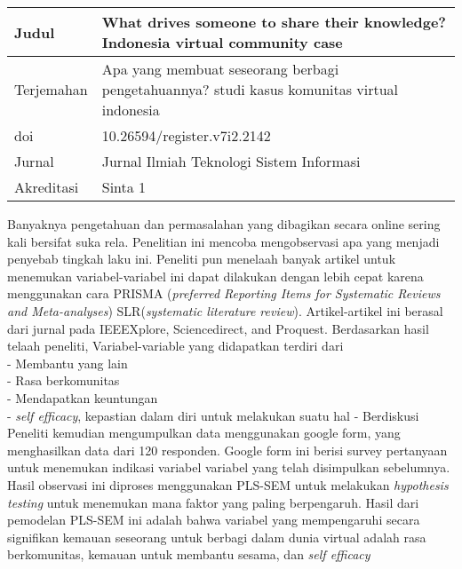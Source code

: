 \documentclass{article}
\begin{document}
\begin{tabular}{|p{2cm}|p{12cm}|}
    \hline
    Judul & What drives someone to share their knowledge? 
    Indonesia virtual community case\cite{WhatsDriveSomSatria2021}\\
    \hline
    Terjemahan & Apa yang membuat seseorang berbagi pengetahuannya? studi kasus komunitas virtual indonesia\\
    \hline
    doi & 10.26594/register.v7i2.2142\\    
    \hline
    Jurnal & Jurnal Ilmiah Teknologi Sistem Informasi\\
    \hline
    Akreditasi & Sinta 1\\
    \hline
\end{tabular}
Banyaknya pengetahuan dan  permasalahan yang dibagikan secara online sering kali bersifat suka rela.
Penelitian ini mencoba mengobservasi 
apa yang menjadi penyebab tingkah laku ini.
 Peneliti pun menelaah banyak artikel untuk menemukan variabel-variabel ini dapat dilakukan dengan lebih cepat karena  menggunakan cara
 PRISMA (\emph{preferred Reporting Items for Systematic
 Reviews and Meta-analyses})
 SLR(\emph{systematic literature review}).
 Artikel-artikel ini berasal dari jurnal pada IEEEXplore, Sciencedirect, and Proquest.
Berdasarkan hasil telaah peneliti, Variabel-variable yang didapatkan terdiri dari\\
- Membantu yang lain\\
- Rasa berkomunitas\\
- Mendapatkan keuntungan\\
- \emph{self efficacy}, kepastian dalam diri untuk melakukan suatu hal
- Berdiskusi\\

Peneliti kemudian mengumpulkan data menggunakan google form, 
yang menghasilkan data dari 120 responden. 
Google form ini berisi survey pertanyaan untuk 
menemukan indikasi  variabel variabel 
yang telah disimpulkan sebelumnya. 
Hasil observasi ini diproses menggunakan 
PLS-SEM untuk melakukan \emph{hypothesis testing} 
untuk menemukan mana faktor yang paling berpengaruh. 
Hasil dari pemodelan PLS-SEM ini adalah bahwa variabel 
yang mempengaruhi
secara signifikan 
kemauan seseorang untuk berbagi dalam dunia virtual adalah 
rasa berkomunitas, 
kemauan untuk membantu sesama, dan \emph{self efficacy}
\newpage
\end{document}
